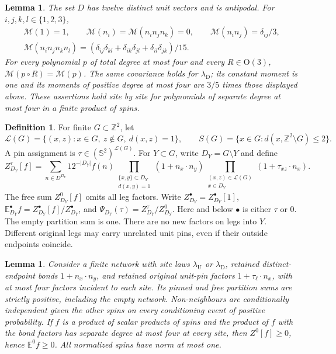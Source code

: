 \documentclass[11pt,reqno]{amsart}
\newtheorem{lemma}[theorem]{Lemma}
\theoremstyle{definition}
\newtheorem{definition}[theorem]{Definition}
\theoremstyle{remark}
\begin{document}
\begin{lemma}\label{l:moments}
The set \(D\) has twelve distinct unit vectors and is antipodal.
For \(i,j,k,l\in\{1,2,3\}\),
\[
 \begin{gathered}
 \mathcal M(1)=1,\qquad \mathcal M(n_i)=\mathcal M(n_in_jn_k)=0,\qquad
 \mathcal M(n_in_j)=\delta_{ij}/3,\\
 \mathcal M(n_in_jn_kn_l)=
 (\delta_{ij}\delta_{kl}+\delta_{ik}\delta_{jl}+\delta_{il}\delta_{jk})/15.
 \end{gathered}
\]
For every polynomial \(p\) of total degree at most four and every
\(R\in\mathrm O(3)\), \(\mathcal M(p\circ R)=\mathcal M(p)\).
The same covariance holds for \(\lambda_{\mathrm D}\); its constant
moment is one and its moments of positive degree at most four are
\(3/5\) times those displayed above.
These assertions hold site by site for polynomials of separate degree
at most four in a finite product of spins.
\end{lemma}

\begin{definition}\label{d:pinmodel}
For finite \(G\subset\mathbb Z^2\), let
\[
 \mathcal L(G)=\{(x,z):x\in G,\ z\notin G,\ d(x,z)=1\},\qquad
 S(G)=\{x\in G:d(x,\mathbb Z^2\setminus G)\le2\}.
\]
A pin assignment is \(\tau\in(\mathbb S^2)^{\mathcal L(G)}\).
For \(Y\subset G\), write \(D_Y=G\setminus Y\) and define
\[
 Z^\tau_{D_Y}[f]=
 \sum_{n\in D^{D_Y}}12^{-|D_Y|}f(n)
 \prod_{\substack{\{x,y\}\subset D_Y\\d(x,y)=1}}(1+n_x\cdot n_y)
 \prod_{\substack{(x,z)\in\mathcal L(G)\\x\in D_Y}}
       (1+\tau_{xz}\cdot n_x).
\]
The free sum \(Z^0_{D_Y}[f]\) omits all leg factors.
Write \(Z^\bullet_{D_Y}=Z^\bullet_{D_Y}[1]\),
\(\mathbb E^\bullet_{D_Y}f=Z^\bullet_{D_Y}[f]/Z^\bullet_{D_Y}\),
and \(\Psi_{D_Y}(\tau)=Z^\tau_{D_Y}/Z^0_{D_Y}\).
Here and below \(\bullet\) is either \(\tau\) or \(0\).
The empty partition sum is one. There are no new factors on legs into \(Y\).
Different original legs may carry unrelated unit pins, even if their
outside endpoints coincide.
\end{definition}

\begin{lemma}\label{l:finitefacts}
Consider a finite network with site laws \(\lambda_{\mathrm U}\) or
\(\lambda_{\mathrm D}\), retained distinct-endpoint bonds
\(1+n_x\cdot n_y\), and retained original unit-pin factors
\(1+\tau_\ell\cdot n_x\), with at most four factors incident to each site.
Its pinned and free partition sums are strictly positive, including
the empty network. Non-neighbours are conditionally independent given
the other spins on every conditioning event of positive probability.
If \(f\) is a product of scalar products of spins and the product of
\(f\) with the bond factors has separate degree at most four at every
site, then \(Z^0[f]\ge0\), hence \(\mathbb E^0 f\ge0\).
All normalized spins have norm at most one.
\end{lemma}
\end{document}

